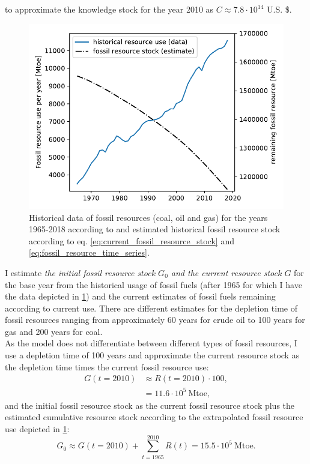 to approximate the knowledge stock for the year 2010 as $C \approx 7.8 \cdot 10^{14}$ U.S. \$. \\
\begin{figure}
        \includegraphics[width = .68 \textwidth]{./figures/fossil_resource_per_year.pdf}
        \caption[Historical data of fossil resources]{Historical data of fossil resources (coal, oil and gas) for the years 1965-2018 according to \cite{dudley2019bp} and estimated historical fossil resource stock according to eq. \ref{eq:current_fossil_resource_stock} and \ref{eq:fossil_resource_time_series}. \label{fig:historical_resource_use}}
\end{figure}
I estimate \textit{the initial fossil resource stock $G_0$ and the current resource stock $G$} for the base year from the historical usage of fossil fuels (after 1965 for which I have the data depicted in \cref{fig:historical_resource_use}) and the current estimates of fossil fuels remaining according to current use. 
There are different estimates for the depletion time of fossil resources ranging from approximately 60 years for crude oil to 100 years for gas and 200 years for coal.\\ As the model does not differentiate between different types of fossil resources, I use a depletion time of 100 years and approximate the current resource stock as the depletion time times the current fossil resource use:
\begin{align} 
  G(t=2010) 
  &\approx R(t=2010) \cdot 100, \nonumber \\
  &= 11.6 \cdot 10^{5} ~ \mathrm{Mtoe},
  \label{eq:current_fossil_resource_stock}
\end{align}
and the initial fossil resource stock as the current fossil resource stock plus the estimated cumulative resource stock according to the extrapolated fossil resource use depicted in \cref{fig:historical_resource_use}:
\begin{equation} 
  G_0 \approx G(t=2010) + \sum_{t=1965}^{2010} R(t) = 15.5 \cdot 10^{5} ~ \mathrm{Mtoe}.
  \label{eq:initial_fossil_resource_approximation}
\end{equation}

